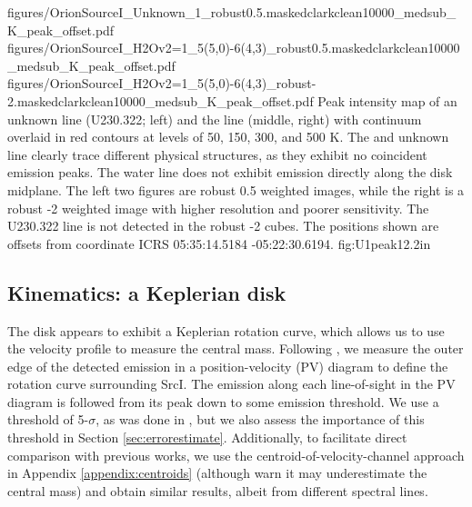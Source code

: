 \documentclass[twocolumn]{aastex61}
\newcommand{\sourcei}{SrcI\xspace}
\begin{document}
\FigureThree
{{figures/OrionSourceI_Unknown_1_robust0.5.maskedclarkclean10000_medsub_K_peak_offset}.pdf}
{{figures/OrionSourceI_H2Ov2=1_5(5,0)-6(4,3)_robust0.5.maskedclarkclean10000_medsub_K_peak_offset}.pdf}
{{figures/OrionSourceI_H2Ov2=1_5(5,0)-6(4,3)_robust-2.maskedclarkclean10000_medsub_K_peak_offset}.pdf}
{Peak intensity map of an unknown line (U230.322; left) and the \water
line (middle, right) with continuum overlaid
in red contours at levels of 
50, 150, 300, and 500 K. %
The \water and unknown line clearly trace different physical structures, as
they exhibit no coincident emission peaks.  The water line does
not exhibit emission directly along the disk midplane.
The left two figures are robust 0.5 weighted images, while the right
is a robust -2 weighted image with higher resolution and poorer
sensitivity.  The U230.322 line is not detected in the robust -2 cubes.
The positions shown are offsets from coordinate ICRS 05:35:14.5184 -05:22:30.6194.
}
{fig:U1peak}{1}{2.2in}


\subsection{Kinematics: a Keplerian disk}
\label{sec:kinematics}
The disk appears to exhibit a Keplerian rotation curve, which allows us to use
the velocity profile to measure the central mass.
Following \citet{Seifried2016a}, we measure the outer edge of the detected
emission in a position-velocity (PV) diagram to define the rotation curve
surrounding \sourcei. 
The emission along each line-of-sight
in the PV diagram is followed from
its peak down to some emission threshold.
We use a threshold of 5-$\sigma$, as was done in \citet{Seifried2016a}, but we
also assess the importance of this threshold in Section
\ref{sec:errorestimate}.
Additionally, to facilitate direct comparison with
previous works, we use the centroid-of-velocity-channel approach
in Appendix \ref{appendix:centroids} (although 
\citet{Seifried2016a} warn it may underestimate the central mass)
and obtain similar results, albeit from different spectral lines.
\end{document}
